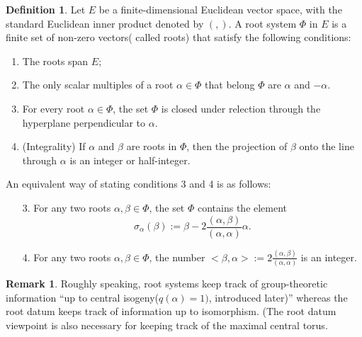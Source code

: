 \documentclass[12pt,a4paper,english]{article}
\theoremstyle{plain}
\theoremstyle{definition}
\newtheorem{defi}[thm]{Definition}
\newtheorem*{rem}{Remark}
\begin{document}
\begin{defi}
Let $E$ be a finite-dimensional Euclidean vector space, with the standard Euclidean inner product denoted by $(,)$. A root system $\Phi$ in $E$ is a finite set of non-zero vectors( called roots) that satisfy the following conditions:
\begin{enumerate}
    \item The roots span $E$;
    \item The only scalar multiples of a root $\alpha\in \Phi$ that belong $\Phi$ are $\alpha$ and $-\alpha$.
    \item For every root $\alpha\in\Phi$, the set $\Phi$ is closed under relection through the hyperplane perpendicular to $\alpha$.
    \item (Integrality) If $\alpha$ and $\beta$ are roots in $\Phi$, then the projection of $\beta$ onto the line through $\alpha$ is an integer or half-integer.
\end{enumerate}
An equivalent way of stating conditions 3 and 4 is as follows:
\begin{enumerate}
    \item[3.] For any two roots $\alpha, \beta\in\Phi$, the set $\Phi$ contains the element 
    \begin{equation*}
        \sigma_{\alpha}(\beta):=\beta-2\frac{(\alpha,\beta)}{(\alpha,\alpha)}\alpha.
    \end{equation*}
    \item[4.] For any two roots $\alpha,\beta\in \Phi$, the number $<\beta,\alpha>:=2\frac{(\alpha,\beta)}{(\alpha,\alpha)}$ is an integer.
\end{enumerate}
\end{defi}
\begin{rem}
Roughly speaking, root systems keep track of group-theoretic information “up to central isogeny($q(\alpha)=1)$, introduced later)” whereas the root
datum keeps track of information up to isomorphism. (The root datum viewpoint is also necessary
for keeping track of the maximal central torus. 
\end{rem}
\end{document}
